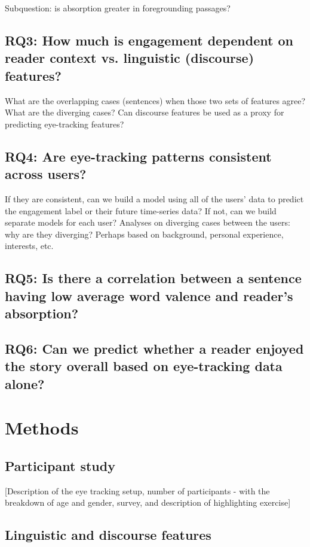 \documentclass[11pt]{article}
\begin{document}
Subquestion: is absorption greater in foregrounding passages?

\subsection{RQ3: How much is engagement dependent on reader context vs. linguistic (discourse) features?}

What are the overlapping cases (sentences) when those two sets of features agree? What are the diverging cases? Can discourse features be used as a proxy for predicting eye-tracking features?

\subsection{RQ4: Are eye-tracking patterns consistent across users?}

If they are consistent, can we build a model using all of the users’ data to predict the engagement label or their future time-series data? If not, can we build separate models for each user? Analyses on diverging cases between the users: why are they diverging? Perhaps based on background, personal experience, interests, etc.

\subsection{RQ5: Is there a correlation between a sentence having low average word valence and reader’s absorption?}

\subsection{RQ6: Can we predict whether a reader enjoyed the story overall based on eye-tracking data alone?}

\section{Methods}

\subsection{Participant study}

[Description of the eye tracking setup, number of participants - with the breakdown of age and gender, survey, and description of highlighting exercise]

\subsection{Linguistic and discourse features}
\end{document}

